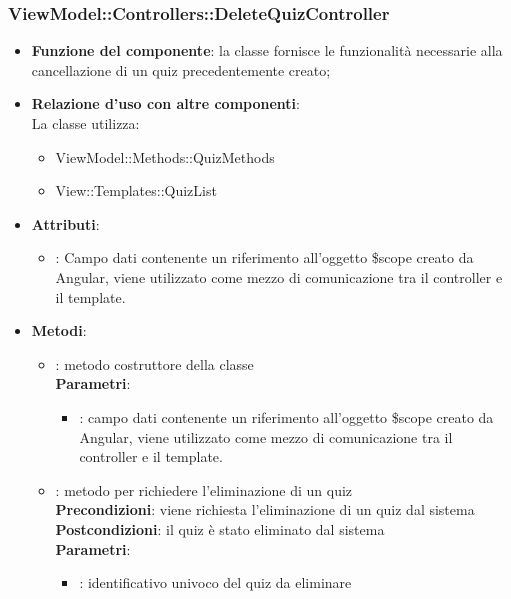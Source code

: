 \subsubsection{ViewModel::Controllers::DeleteQuizController}
\begin{itemize}
\item\textbf{Funzione del componente}: la classe fornisce le funzionalità necessarie alla cancellazione di un quiz precedentemente creato;
	\item\textbf{Relazione d'uso con altre componenti}: \\
La classe utilizza:
	\begin{itemize}
		\item ViewModel::Methods::QuizMethods
		\item View::Templates::QuizList
	\end{itemize}
\item\textbf{Attributi}:
	\begin{itemize}
		\item{}: Campo dati contenente un riferimento all’oggetto \$scope creato da Angular, viene utilizzato come mezzo di comunicazione tra il controller e il template.\\
	\end{itemize}
\item\textbf{Metodi}:
	\begin{itemize}
		\item{}: metodo costruttore della classe\\
		\textbf{Parametri}:
			\begin{itemize}
				\item{}: campo dati contenente un riferimento all’oggetto \$scope creato da Angular, viene utilizzato come mezzo di comunicazione tra il controller e il template.\\
			\end{itemize}
		\item{}:  metodo per richiedere l'eliminazione di un quiz\\
		\textbf{Precondizioni}: viene richiesta l'eliminazione di un quiz dal sistema\\
		\textbf{Postcondizioni}: il quiz è stato eliminato dal sistema\\
		\textbf{Parametri}:
			\begin{itemize}
				\item{}: identificativo univoco del quiz da eliminare\\
			\end{itemize}
	\end{itemize}
\end{itemize}

